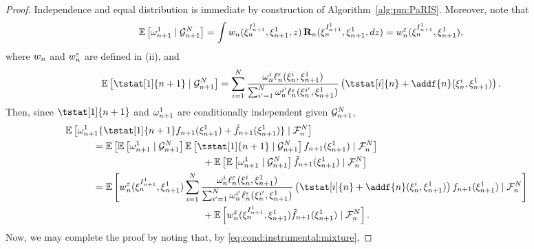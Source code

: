 \begin{proof}
Independence and equal distribution is immediate by construction of Algorithm~\ref{alg:pm:PaRIS}. Moreover, note that
\begin{equation} \label{eq:expected:weight:given:G}
\pE \left[\ewght{n + 1}{1} \cond \calG{n + 1}{\N} \right] = \int \wgtfunc{n}(\epart{n}{\ind{n + 1}{1}}, \epart{n + 1}{1}, z) \, \ukdist{n}(\epart{n}{\ind{n + 1}{1}}, \epart{n + 1}{1}, \rmd z) = \wgtfuncmod{n}(\epart{n}{\ind{n + 1}{1}}, \epart{n + 1}{1}), 
\end{equation}
where $w_{n}$ and $w^{\varepsilon}_{n}$ are defined in (ii), and 
$$
\pE \left[\tstat[1]{n + 1} \cond \calG{n + 1}{\N} \right] = \sum_{i = 1}^\N \frac{\ewght{n}{i} \udmod{n} (\epart{n}{i}, \epart{n + 1}{1})}{\sum_{i' = 1}^{\N} \ewght{n}{i'} \udmod{n}(\epart{n}{i'}, \epart{n + 1}{1})} \left(\tstat[i]{n} + \addf{n}(\epart{n}{i}, \epart{n + 1}{1}) \right). 
$$
Then, since $\tstat[1]{n + 1}$ and  $\omega_{n + 1}^{1}$ are conditionally independent given $\mathcal{G}_{n + 1}^{N}$,
\begin{align*}
\lefteqn{\pE \left[\ewghthat{n + 1}{1} \{ \tstat[1]{n + 1} f_{n + 1}(\epart{n + 1}{1}) + \ftd{n + 1}(\epart{n + 1}{1}) \} \cond \calF{n}{\N}\right]} \hspace{10mm} \nonumber \\
&= \pE \left[\pE \left[ \ewghthat{n + 1}{1} \cond \calG{n + 1}{\N} \right] \pE \left[\tstat[1]{n + 1} \cond \calG{n + 1}{N}\right] f_{n + 1}(\epart{n + 1}{1}) \cond \calF{n}{\N} \right] \nonumber \\
&\hspace{4cm} + \pE \left[ \pE \left[ \ewghthat{n + 1}{1} \cond \calG{n + 1}{\N} \right] \ftd{n + 1}(\epart{n + 1}{1}) \cond \calF{n}{N} \right] \nonumber \\
&= \pE \left[ \wgtfuncmod{n}(\epart{n}{\ind{n + 1}{1}}, \epart{n + 1}{1}) \sum_{i = 1}^\N \frac{\ewght{n}{i} \udmod{n} (\epart{n}{i}, \epart{n + 1}{1})}{\sum_{i' = 1}^{\N} \ewght{n}{i'} \udmod{n} (\epart{n}{i'}, \epart{n + 1}{1})} \left(\tstat[i]{n} + \addf{n}(\epart{n}{i}, \epart{n + 1}{1}) \right) f_{n + 1}(\epart{n + 1}{1}) \cond \calF{n}{\N} \right] \nonumber \\
&\hspace{4cm} + \pE \left[\wgtfuncmod{n}(\epart{n}{\ind{n + 1}{1}}, \epart{n + 1}{1}) \ftd{n + 1}(\epart{n + 1}{1}) \cond \calF{n}{\N} \right]. \label{eq:exp:decomposition}
\end{align*}
Now, we may complete the proof by noting that, by \eqref{eq:cond:instrumental:mixture},  

\end{proof}
